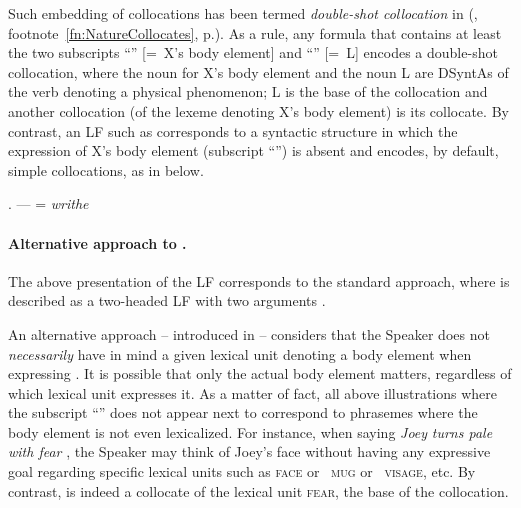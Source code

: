 Such embedding of collocations has been termed \emph{double-shot collocation} in  (, footnote~\ref{fn:NatureCollocates}, p.\thinspace\pageref{fn:NatureCollocates}). As a rule, any  formula that contains at least the two subscripts ``'' [=~X's body element] and ``'' [=~L] encodes a double-shot collocation, where the noun for X's body element and the noun L are \mbox{DSyntAs} of the verb denoting a physical phenomenon; L is the base of the collocation and another collocation (of the lexeme denoting X's body element) is its collocate. By contrast, an LF such as  corresponds to a syntactic structure in which the expression of X's body element (subscript ``'') is absent and encodes, by default, simple collocations, as in \Next below.

\begingroup
\small

\ex. --- =  \textit{writhe} 

\endgroup

\paragraph*{Alternative approach to .}

The above presentation of the LF  corresponds to the standard approach, where  is described as a two-headed LF with two arguments \parencites{Iordanskaja1972,Iordanskaja1986}.

An alternative approach -- introduced in \textcite{MelcukPolguere2021} -- considers that the Speaker does not \emph{necessarily} have in mind a given lexical unit denoting a body element when expressing . It is possible that only the actual body element matters, regardless of which lexical unit expresses it. As a matter of fact, all above illustrations where the subscript ``'' does not appear next to  correspond to phrasemes where the body element is not even lexicalized. For instance, when saying \textit{Joey} \textit{turns pale with fear} , the Speaker may think of Joey's face without having any expressive goal regarding specific lexical units such as \textsc{face} or ~\textsc{mug} or ~\textsc{visage}, etc. By contrast,  is indeed a collocate of the lexical unit \textsc{fear}, the base of the collocation.

